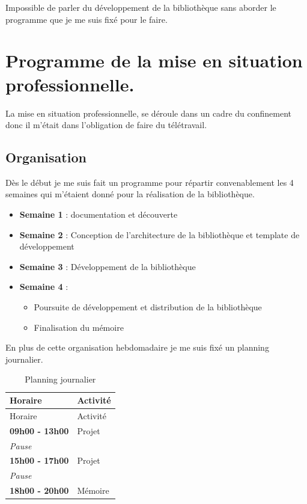 \documentclass[11pt,a4paper,krantz2,11pt,oneside]{krantz}
\providecommand{\tightlist}{%
  \setlength{\itemsep}{0pt}\setlength{\parskip}{0pt}}
\begin{document}
Impossible de parler du développement de la bibliothèque sans aborder le programme que je me suis fixé pour le faire.

\hypertarget{programme-de-la-mise-en-situation-professionnelle.}{%
\section{Programme de la mise en situation professionnelle.}\label{programme-de-la-mise-en-situation-professionnelle.}}

La mise en situation professionnelle, se déroule dans un cadre du confinement donc il m'était dans l'obligation de faire du télétravail.

\hypertarget{organisation}{%
\subsection{Organisation}\label{organisation}}

Dès le début je me suis fait un programme pour répartir convenablement les 4 semaines qui m'étaient donné pour la réalisation de la bibliothèque.

\begin{itemize}
\tightlist
\item
  \textbf{Semaine 1} : documentation et découverte
\item
  \textbf{Semaine 2} : Conception de l'architecture de la bibliothèque et template de développement
\item
  \textbf{Semaine 3} : Développement de la bibliothèque
\item
  \textbf{Semaine 4} :

  \begin{itemize}
  \tightlist
  \item
    Poursuite de développement et distribution de la bibliothèque
  \item
    Finalisation du mémoire
  \end{itemize}
\end{itemize}

En plus de cette organisation hebdomadaire je me suis fixé un planning journalier.

\begin{longtable}[]{@{}ll@{}}
\caption{\label{tab:planning} Planning journalier}\tabularnewline
\toprule
Horaire & Activité\tabularnewline
\midrule
\endfirsthead
\toprule
Horaire & Activité\tabularnewline
\midrule
\endhead
\textbf{09h00 - 13h00} & Projet\tabularnewline
\emph{Pause} &\tabularnewline
\textbf{15h00 - 17h00} & Projet\tabularnewline
\emph{Pause} &\tabularnewline
\textbf{18h00 - 20h00} & Mémoire\tabularnewline
\bottomrule
\end{longtable}
\end{document}
